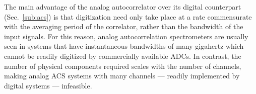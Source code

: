 \documentclass{ws-rv961x669}
\begin{document}
The main advantage of the analog autocorrelator over its digital counterpart (Sec.~\ref{sub:acs}) is that digitization need only take place at a rate commensurate with the averaging period of the correlator, rather than the bandwidth of the input signals. For this reason, analog autocorrelation spectrometers are usually seen in systems that have instantaneous bandwidths of many gigahertz which cannot be readily digitized by commercially available ADCs. In contrast, the number of physical components required scales with the number of channels, making analog ACS systems with many channels --- readily implemented by digital systems ---  infeasible.





\end{document}
